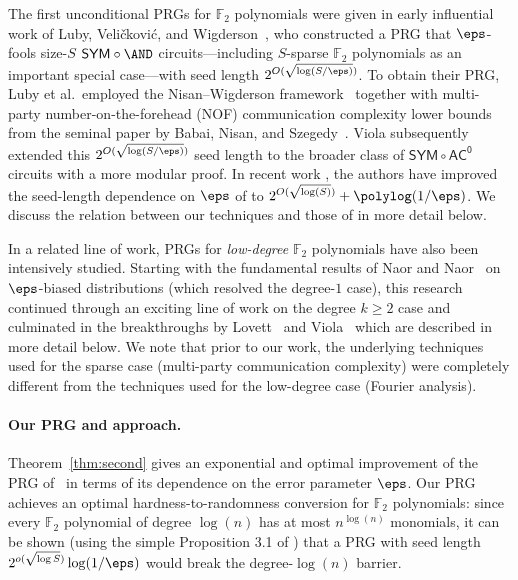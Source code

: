 \documentclass[11pt]{article}
\numberwithin{equation}{section}
\theoremstyle{definition}
\theoremstyle{plain}
\theoremstyle{plain}
\newcommand{\acz}{\mathsf{AC^0}}
\newcommand{\SYM}{\mathsf{SYM}}
\renewcommand{\F}{\mathds{F}}
\begin{document}
The first unconditional PRGs for $\F_2$ polynomials were given in early influential work of Luby, Veli{\v{c}}kovi{\'c}, and Wigderson~\cite{LVW93}, who constructed a PRG that $\eps$-fools size-$S$ $\SYM \circ \AND$ circuits---including $S$-sparse $\F_2$ polynomials as an important special case---with seed length $2^{O(\sqrt{\log (S/\eps)})}$.  To obtain their PRG, Luby et al.~employed the Nisan--Wigderson framework~\cite{NW94} together with multi-party number-on-the-forehead (NOF) communication complexity lower bounds from the seminal
%
paper by  %
Babai, Nisan, and Szegedy~\cite{BNS92}. Viola \cite{Vio06} subsequently extended this $2^{O(\sqrt{\log (S/\eps)})}$ seed length to the broader class of $\SYM \circ \acz$ circuits with a more modular proof.  
In recent work \cite{ST18}, the authors have improved the
%
seed-length   %
dependence on $\eps$ of \cite{LVW93,Vio06} to $2^{O(\sqrt{\log (S)})} + \polylog(1/\eps)$.  We discuss the relation between our techniques and those of \cite{ST18} in more detail below.



In a related line of work, PRGs for \emph{low-degree} $\F_2$ polynomials have also been intensively studied.  Starting with the fundamental results of Naor and Naor~\cite{NN93} on $\eps$-biased distributions (which resolved the degree-$1$ case), this research continued through an exciting line of work on the degree $k \ge 2$ case \cite{Bog05,BV10} and culminated in the breakthroughs %
by  %
Lovett~\cite{Lov09} and Viola~\cite{Vio09} which are described in more detail below.
We note that prior to our work, the underlying techniques used for the sparse case (multi-party communication complexity) were completely different from the techniques used for the low-degree case (Fourier analysis).

\vspace{-5pt} 
\paragraph{Our PRG and approach.} Theorem~\ref{thm:second} gives an exponential and optimal improvement of the PRG of~\cite{LVW93} in terms of its dependence on the error parameter $\eps$. Our PRG  achieves an optimal %
hardness-to-randomness   %
conversion for $\F_2$ polynomials: since every
%
%
%
$\F_2$ polynomial
of degree $\log(n)$   %
has at most $n^{\log(n)}$ monomials, it can be shown (using the simple Proposition 3.1 of \cite{Vio09}) that a PRG with seed length $2^{o(\sqrt{\log S})}\log(1/\eps)$ would break the 
degree-$\log(n)$ barrier. %
\end{document}
